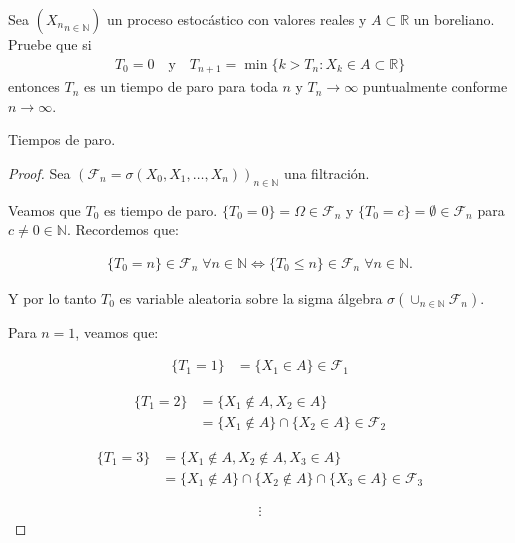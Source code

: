 \begin{problema}
	Sea $\left({X_n}_{n\in\mathbb{N}}\right)$ un proceso estocástico con valores reales y $A\subset \mathbb{R}$ un boreliano. 
	Pruebe que si
	\begin{align}
		T_0=0\quad\text{y}\quad T_{n+1}=\min\{k>T_n: X_k\in A \subset \mathbb{R}\}
	\end{align}
	entonces $T_n$ es un tiempo de paro para toda $n$ y $T_n\to \infty$ puntualmente conforme $n\to\infty$. 

	\begin{categoria} 
		Tiempos de paro.
	\end{categoria}
\end{problema}
\afterstatement		
\begin{proof}\pn
	Sea $(\mathscr{F}_n = \sigma(  X_0, X_1, \dots, X_n ))_{ n \in \mathbb{N}}$ una filtración.\pn

	Veamos que $T_0$ es tiempo de paro. $\{T_0 = 0\} = \Omega \in \mathscr{F}_n$ y 
	$\{T_0 = c\} = \emptyset \in \mathscr{F}_n$ para $c \not= 0 \in \mathbb{N}$. Recordemos que:		
	
    \begin{align}\label{problema_1_1:equivalencia_varable_aleatoria}
		\{T_0 = n\} \in \mathscr{F}_n \; \forall n \in \mathbb{N} \iff 
		\{T_0 \leq n\} \in \mathscr{F}_n \; \forall n \in \mathbb{N}.
	\end{align}\pn
	
    Y por lo tanto $T_0$ es variable aleatoria sobre la sigma álgebra $\sigma(\cup_{n \in \mathbb{N}} 
	\mathscr{F}_n)$.\pn

	Para $n=1$, veamos que:
 
	\begin{align}
			\{T_1 = 1\}     &= \{ X_1 \in A \}	\in \mathscr{F}_1 
	\end{align}
	
	\begin{align}
			\{T_1 = 2\} 	&= 	\{ X_1 \not\in A, X_2 \in A \} \\
							&= 	\{ X_1 \not\in A \} \cap \{X_2 \in A \} \in \mathscr{F}_2	
	\end{align}
	
	\begin{align}
			\{T_1 = 3\} 	&=	\{ X_1 \not\in A, X_2 \not\in A,  X_3 \in A \} \\ 
							&= 	\{ X_1 \not\in A \} \cap \{ X_2 \not\in A \} \cap \{X_3 \in A \} \in \mathscr{F}_3
	\end{align}
	
	\begin{align}
		\vdots
	\end{align}
	

\end{proof}
